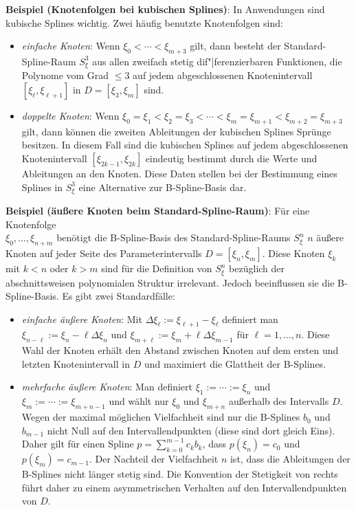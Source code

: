 \linie
\pagebreak

\textbf{Beispiel (Knotenfolgen bei kubischen Splines)}:
In Anwendungen sind kubische Splines wichtig.
Zwei häufig benutzte Knotenfolgen sind:
\begin{itemize}
    \item
    \emph{einfache Knoten}:
    Wenn $\xi_0 < \dotsb < \xi_{m+3}$ gilt,
    dann besteht der Standard-Spline-Raum $S_\xi^3$ aus allen zweifach stetig dif"|ferenzierbaren
    Funktionen, die Polynome vom Grad $\le 3$ auf jedem abgeschlossenen Knotenintervall
    $[\xi_\ell, \xi_{\ell+1}]$ in $D = [\xi_3, \xi_m]$ sind.

    \item
    \emph{doppelte Knoten}:
    Wenn $\xi_0 = \xi_1 < \xi_2 = \xi_3 < \dotsb < \xi_m = \xi_{m+1} < \xi_{m+2} = \xi_{m+3}$ gilt,
    dann können die zweiten Ableitungen der kubischen Splines Sprünge besitzen.
    In diesem Fall sind die kubischen Splines auf jedem abgeschlossenen Knotenintervall
    $[\xi_{2k-1}, \xi_{2k}]$ eindeutig bestimmt durch die Werte und Ableitungen an den Knoten.
    Diese Daten stellen bei der Bestimmung eines Splines in $S_\xi^3$
    eine Alternative zur B-Spline-Basis dar.
\end{itemize}

\linie

\textbf{Beispiel (äußere Knoten beim Standard-Spline-Raum)}:
Für eine Knotenfolge\\
$\xi_0, \dotsc, \xi_{n+m}$ benötigt die B-Spline-Basis des
Standard-Spline-Raums $S_\xi^n$ $n$ äußere Knoten auf jeder Seite des Parameterintervalls
$D = [\xi_n, \xi_m]$.
Diese Knoten $\xi_k$ mit $k < n$ oder $k > m$ sind für die Definition von $S_\xi^n$ bezüglich
der abschnittsweisen polynomialen Struktur irrelevant.
Jedoch beeinflussen sie die B-Spline-Basis.
Es gibt zwei Standardfälle:
\begin{itemize}
    \item
    \emph{einfache äußere Knoten}:
    Mit $\Delta\xi_\ell := \xi_{\ell+1} - \xi_\ell$ definiert man
    $\xi_{n-\ell} := \xi_n - \ell \Delta\xi_n$ und $\xi_{m+\ell} := \xi_m + \ell \Delta\xi_{m-1}$
    für $\ell = 1, \dotsc, n$.
    Diese Wahl der Knoten erhält den Abstand zwischen Knoten auf dem ersten und letzten
    Knotenintervall in $D$ und maximiert die Glattheit der B-Splines.

    \item
    \emph{mehrfache äußere Knoten}:
    Man definiert  $\xi_1 := \dotsb := \xi_n$ und $\xi_m := \dotsb := \xi_{m+n-1}$
    und wählt nur $\xi_0$ und $\xi_{m+n}$ außerhalb des Intervalls $D$.
    Wegen der maximal möglichen Vielfachheit sind nur die B-Splines $b_0$ und $b_{m-1}$
    nicht Null auf den Intervallendpunkten (diese sind dort gleich Eins).
    Daher gilt für einen Spline $p = \sum_{k=0}^{m-1} c_k b_k$, dass
    $p(\xi_n) = c_0$ und $p(\xi_m) = c_{m-1}$.
    Der Nachteil der Vielfachheit $n$ ist, dass die Ableitungen der B-Splines nicht länger
    stetig sind.
    Die Konvention der Stetigkeit von rechts führt daher zu einem asymmetrischen Verhalten
    auf den Intervallendpunkten von $D$.
\end{itemize}

